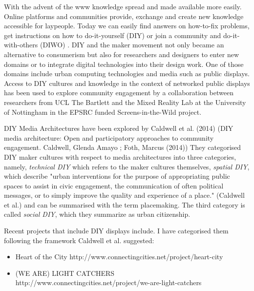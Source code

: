 With the advent of the www knowledge spread and made available more easily. Online platforms and communities provide, exchange and create new knowledge accessible for laypeople. Today we can easily find answers on how-to-fix problems, get instructions on how to do-it-yourself (DIY) or join a community and do-it-with-others (DIWO) . DIY and the maker movement not only became an alternative to consumerism but also for researchers and designers to enter new domains or to integrate digital technologies into their design work.  
One of those domains include urban computing technologies and media such as public displays. 
Access to DIY cultures and knowledge in the context of networked public displays has been used to explore community engagement by a collaboration between researchers from UCL The Bartlett and the Mixed Reality Lab at the University of Nottingham in the EPSRC funded Screens-in-the-Wild  project. 

DIY Media Architectures have been explored by Caldwell et al. (2014) (DIY media architecture: Open and participatory approaches to community engagement. Caldwell, Glenda Amayo ; Foth, Marcus (2014)) 
They categorised DIY maker cultures with respect to media architectures into three categories, namely, \textit{technical DIY} which refers to the maker cultures themselves, \textit{spatial DIY}, which describe "urban interventions for the purpose of appropriating public spaces to assist in civic engagement, the communication of often political messages, or to simply improve the quality and experience of a place." (Caldwell et al.) and can be summarised with the term placemaking. The third category is called \textit{social DIY}, which they summarize as urban citizenship.

Recent projects that include DIY displays include. I have categorised them following the framework Caldwell et al. suggested:

\begin{itemize}
\item Heart of the City http://www.connectingcities.net/project/heart-city
\item (WE ARE) LIGHT CATCHERS http://www.connectingcities.net/project/we-are-light-catchers
\end{itemize}


